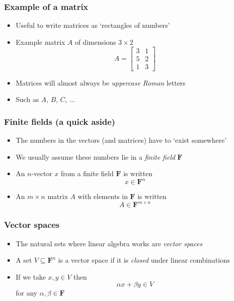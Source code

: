 \documentclass{beamer}
\newcommand{\field}{\mathbf{F}}
\begin{document}
    \begin{frame}
        \frametitle{Example of a matrix}
        \begin{itemize}\itemsep=12pt
            \item Useful to write matrices as `rectangles of numbers'
            \item Example matrix $A$ of dimensions $3\times 2$
            \[
                A = \begin{bmatrix}
                    3 & 1\\
                    5 & 2\\
                    1 & 3
                \end{bmatrix}
            \]
            \item Matrices will almost always be \emph{uppercase Roman} letters
            \item Such as $A$, $B$, $C$, ...
        \end{itemize}
    \end{frame}

    \begin{frame}
        \frametitle{Finite fields (a quick aside)}
        \begin{itemize}\itemsep=12pt
            \item The numbers in the vectors (and matrices) have to `exist somewhere'
            \item We usually assume these numbers lie in a \emph{finite field} $\field$
            \item An $n$-vector $x$ from a finite field $\field$ is written
            \[
                x \in \field^n
            \]
            \item An $m\times n$ matrix $A$ with elements in $\field$ is written
            \[
                A \in \field^{m\times n}
            \]
        \end{itemize}
    \end{frame}

    \begin{frame}
        \frametitle{Vector spaces}
        \begin{itemize}\itemsep=12pt
            \item The natural sets where linear algebra works are \emph{vector spaces}
            \pause
            \item A set $V \subseteq \field^n$ is a vector space if it is \emph{closed} under linear combinations
            \item If we take $x, y \in V$ then
            \[
                \alpha x + \beta y \in V
            \]
            for any $\alpha, \beta \in \field$
        \end{itemize}
    \end{frame}
\end{document}
